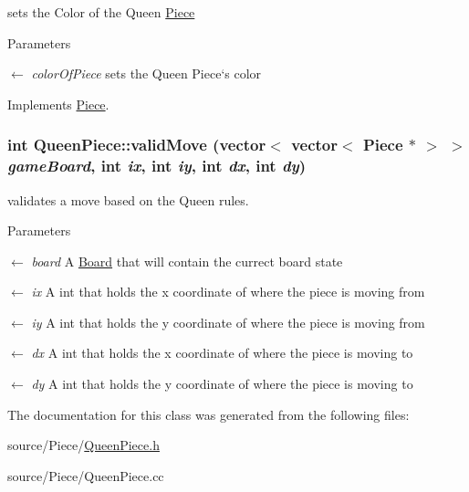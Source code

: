 sets the Color of the Queen \hyperlink{classPiece}{Piece} 
\begin{DoxyParams}{Parameters}
\item[\mbox{$\leftarrow$} {\em colorOfPiece}]sets the Queen Piece`s color \end{DoxyParams}


Implements \hyperlink{classPiece_a1387cb503dca308ac1e3bbe38a70a073}{Piece}.\hypertarget{classQueenPiece_a5db59b743df799adc37ce6a3c0230458}{
\subsubsection[{validMove}]{\setlength{\rightskip}{0pt plus 5cm}int QueenPiece::validMove (vector$<$ vector$<$ {\bf Piece} $\ast$ $>$ $>$ {\em gameBoard}, \/  int {\em ix}, \/  int {\em iy}, \/  int {\em dx}, \/  int {\em dy})}}
\label{classQueenPiece_a5db59b743df799adc37ce6a3c0230458}


validates a move based on the Queen rules. 
\begin{DoxyParams}{Parameters}
\item[\mbox{$\leftarrow$} {\em board}]A \hyperlink{classBoard}{Board} that will contain the currect board state \item[\mbox{$\leftarrow$} {\em ix}]A int that holds the x coordinate of where the piece is moving from \item[\mbox{$\leftarrow$} {\em iy}]A int that holds the y coordinate of where the piece is moving from \item[\mbox{$\leftarrow$} {\em dx}]A int that holds the x coordinate of where the piece is moving to \item[\mbox{$\leftarrow$} {\em dy}]A int that holds the y coordinate of where the piece is moving to \end{DoxyParams}


The documentation for this class was generated from the following files:\begin{DoxyCompactItemize}
\item 
source/Piece/\hyperlink{QueenPiece_8h}{QueenPiece.h}\item 
source/Piece/QueenPiece.cc\end{DoxyCompactItemize}
